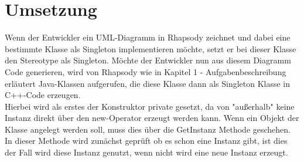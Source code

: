 \section{Umsetzung}

Wenn der Entwickler ein UML-Diagramm in Rhapsody zeichnet und dabei eine bestimmte Klasse als Singleton implementieren möchte, setzt er bei dieser Klasse den Stereotype als Singleton. Möchte der Entwickler nun aus diesem Diagramm Code generieren, wird von Rhapsody wie in Kapitel 1 - Aufgabenbeschreibung erläutert Java-Klassen aufgerufen, die diese Klasse dann als Singleton Klasse in C++-Code erzeugen. 
\\
Hierbei wird als erstes der Konstruktor private gesetzt, da von "außerhalb" keine Instanz direkt über den new-Operator erzeugt werden kann. Wenn ein Objekt der Klasse angelegt werden soll, muss dies über die GetInstanz Methode geschehen. In dieser Methode wird zunächst geprüft ob es schon eine Instanz gibt, ist dies der Fall wird diese Instanz genutzt, wenn nicht wird eine neue Instanz erzeugt. 




